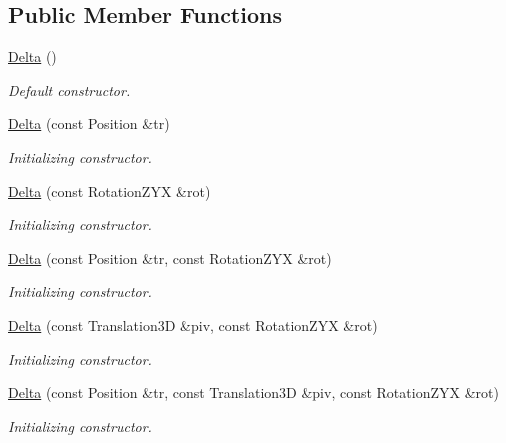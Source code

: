 \subsection*{Public Member Functions}
\begin{DoxyCompactItemize}
\item 
\hyperlink{class_d_d4hep_1_1_alignments_1_1_delta_a1db2d4fa836434f834b0bd0502bc43d7}{Delta} ()
\begin{DoxyCompactList}\small\item\em Default constructor. \end{DoxyCompactList}\item 
\hyperlink{class_d_d4hep_1_1_alignments_1_1_delta_a4da265200c1c24051c8861dd7f5d09f2}{Delta} (const Position \&tr)
\begin{DoxyCompactList}\small\item\em Initializing constructor. \end{DoxyCompactList}\item 
\hyperlink{class_d_d4hep_1_1_alignments_1_1_delta_ae692692779f93fe44ddcf501e1e4cdcd}{Delta} (const Rotation\+Z\+YX \&rot)
\begin{DoxyCompactList}\small\item\em Initializing constructor. \end{DoxyCompactList}\item 
\hyperlink{class_d_d4hep_1_1_alignments_1_1_delta_a0e678885ecb41d17d6a4d3f2ded6679e}{Delta} (const Position \&tr, const Rotation\+Z\+YX \&rot)
\begin{DoxyCompactList}\small\item\em Initializing constructor. \end{DoxyCompactList}\item 
\hyperlink{class_d_d4hep_1_1_alignments_1_1_delta_a8ade447b698a6765cf76eb5e98af91ad}{Delta} (const Translation3D \&piv, const Rotation\+Z\+YX \&rot)
\begin{DoxyCompactList}\small\item\em Initializing constructor. \end{DoxyCompactList}\item 
\hyperlink{class_d_d4hep_1_1_alignments_1_1_delta_a1694ccda25ab2214ec8145c36153ab37}{Delta} (const Position \&tr, const Translation3D \&piv, const Rotation\+Z\+YX \&rot)
\begin{DoxyCompactList}\small\item\em Initializing constructor. \end{DoxyCompactList}\item 

\end{DoxyCompactItemize}
